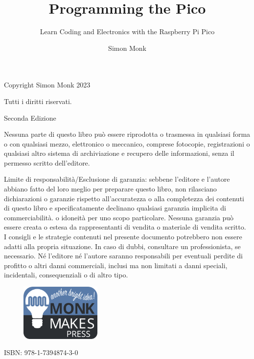 
\frontmatter

\title{Programming the Pico}
\subtitle{Learn Coding and Electronics with the Raspberry Pi Pico}
\date{\vspace{-5ex}}
\author{Simon Monk} 

\begin{copyright}
Copyright Simon Monk 2023

Tutti i diritti riservati.

Seconda Edizione

\vspace{0.5in}

Nessuna parte di questo libro può essere riprodotta o trasmessa in qualsiasi forma o con qualsiasi mezzo, elettronico o meccanico, comprese fotocopie, registrazioni o qualsiasi altro sistema di archiviazione e recupero delle informazioni, senza il permesso scritto dell'editore.

Limite di responsabilità/Esclusione di garanzia: sebbene l'editore e l'autore abbiano fatto del loro meglio per preparare questo libro, non rilasciano dichiarazioni o garanzie rispetto all'accuratezza o alla completezza dei contenuti di questo libro e specificatamente declinano qualsiasi garanzia implicita di commerciabilità. o idoneità per uno scopo particolare. Nessuna garanzia può essere creata o estesa da rappresentanti di vendita o materiale di vendita scritto. I consigli e le strategie contenuti nel presente documento potrebbero non essere adatti alla propria situazione. In caso di dubbi, consultare un professionista, se necessario. Né l'editore né l'autore saranno responsabili per eventuali perdite di profitto o altri danni commerciali, inclusi ma non limitati a danni speciali, incidentali, consequenziali o di altro tipo.

\vspace{1in}

\begin{figure}[hbt!]
\includegraphics[width=4cm]{ch_00_FM/logo_mm_press.png}
\end{figure}

ISBN: 978-1-7394874-3-0

\end{copyright}

